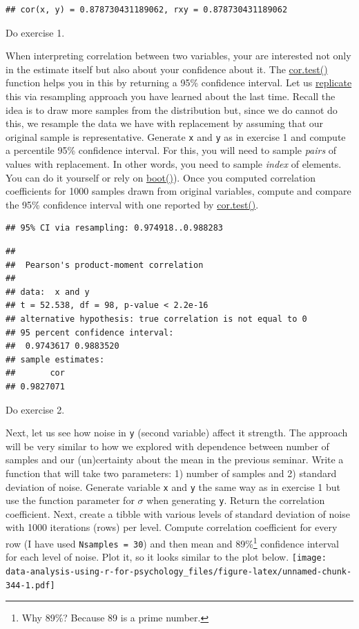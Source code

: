 \documentclass[
]{book}
\begin{document}
\begin{verbatim}
## cor(x, y) = 0.878730431189062, rxy = 0.878730431189062
\end{verbatim}

Do exercise 1.

When interpreting correlation between two variables, your are interested not only in the estimate itself but also about your confidence about it. The \href{https://stat.ethz.ch/R-manual/R-devel/library/stats/html/cor.test.html}{cor.test()} function helps you in this by returning a 95\% confidence interval. Let us \href{https://stat.ethz.ch/R-manual/R-devel/library/base/html/lapply.html}{replicate} this via resampling approach you have learned about the last time. Recall the idea is to draw more samples from the distribution but, since we do cannot do this, we resample the data we have with replacement by assuming that our original sample is representative. Generate \texttt{x} and \texttt{y} as in exercise 1 and compute a percentile 95\% confidence interval. For this, you will need to sample \emph{pairs} of values with replacement. In other words, you need to sample \emph{index} of elements. You can do it yourself or rely on \href{https://stat.ethz.ch/R-manual/R-devel/library/boot/html/boot.html}{boot()}). Once you computed correlation coefficients for 1000 samples drawn from original variables, compute and compare the 95\% confidence interval with one reported by \href{https://stat.ethz.ch/R-manual/R-devel/library/stats/html/cor.test.html}{cor.test()}.

\begin{verbatim}
## 95% CI via resampling: 0.974918..0.988283
\end{verbatim}

\begin{verbatim}
## 
##  Pearson's product-moment correlation
## 
## data:  x and y
## t = 52.538, df = 98, p-value < 2.2e-16
## alternative hypothesis: true correlation is not equal to 0
## 95 percent confidence interval:
##  0.9743617 0.9883520
## sample estimates:
##       cor 
## 0.9827071
\end{verbatim}

Do exercise 2.

Next, let us see how noise in \texttt{y} (second variable) affect it strength. The approach will be very similar to how we explored with dependence between number of samples and our (un)certainty about the mean in the previous seminar. Write a function that will take two parameters: 1) number of samples and 2) standard deviation of noise. Generate variable \texttt{x} and \texttt{y} the same way as in exercise 1 but use the function parameter for \(\sigma\) when generating \texttt{y}. Return the correlation coefficient. Next, create a tibble with various levels of standard deviation of noise with 1000 iterations (rows) per level. Compute correlation coefficient for every row (I have used \texttt{Nsamples\ =\ 30}) and then mean and 89\%\footnote{Why 89\%? Because 89 is a prime number.} confidence interval for each level of noise. Plot it, so it looks similar to the plot below.
\texttt{[image: data-analysis-using-r-for-psychology\_files/figure-latex/unnamed-chunk-344-1.pdf]}
\end{document}
